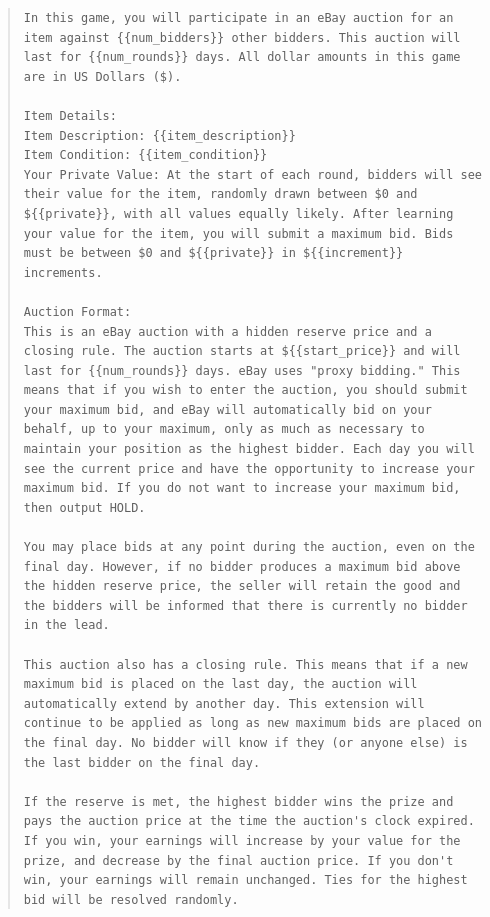 \documentclass{article} %
\begin{document}
\begin{quote}
\begin{lstlisting}[basicstyle=\ttfamily, breaklines=true]
In this game, you will participate in an eBay auction for an item against {{num_bidders}} other bidders. This auction will last for {{num_rounds}} days. All dollar amounts in this game are in US Dollars ($).

Item Details:
Item Description: {{item_description}}
Item Condition: {{item_condition}}
Your Private Value: At the start of each round, bidders will see their value for the item, randomly drawn between $0 and ${{private}}, with all values equally likely. After learning your value for the item, you will submit a maximum bid. Bids must be between $0 and ${{private}} in ${{increment}} increments.

Auction Format:
This is an eBay auction with a hidden reserve price and a closing rule. The auction starts at ${{start_price}} and will last for {{num_rounds}} days. eBay uses "proxy bidding." This means that if you wish to enter the auction, you should submit your maximum bid, and eBay will automatically bid on your behalf, up to your maximum, only as much as necessary to maintain your position as the highest bidder. Each day you will see the current price and have the opportunity to increase your maximum bid. If you do not want to increase your maximum bid, then output HOLD.

You may place bids at any point during the auction, even on the final day. However, if no bidder produces a maximum bid above the hidden reserve price, the seller will retain the good and the bidders will be informed that there is currently no bidder in the lead.

This auction also has a closing rule. This means that if a new maximum bid is placed on the last day, the auction will automatically extend by another day. This extension will continue to be applied as long as new maximum bids are placed on the final day. No bidder will know if they (or anyone else) is the last bidder on the final day.

If the reserve is met, the highest bidder wins the prize and pays the auction price at the time the auction's clock expired. If you win, your earnings will increase by your value for the prize, and decrease by the final auction price. If you don't win, your earnings will remain unchanged. Ties for the highest bid will be resolved randomly.
\end{lstlisting}
\end{quote}
\end{document}
